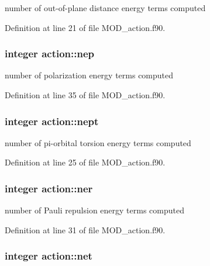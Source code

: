 number of out-\/of-\/plane distance energy terms computed 



Definition at line 21 of file M\-O\-D\-\_\-action.\-f90.

\hypertarget{classaction_a5f4acddc07739f99eea41cdb6be1b8dc}{
\subsubsection[{nep}]{\setlength{\rightskip}{0pt plus 5cm}integer action\-::nep}}\label{classaction_a5f4acddc07739f99eea41cdb6be1b8dc}


number of polarization energy terms computed 



Definition at line 35 of file M\-O\-D\-\_\-action.\-f90.

\hypertarget{classaction_a6fd320a2f65ee54d671119c638e1c85e}{
\subsubsection[{nept}]{\setlength{\rightskip}{0pt plus 5cm}integer action\-::nept}}\label{classaction_a6fd320a2f65ee54d671119c638e1c85e}


number of pi-\/orbital torsion energy terms computed 



Definition at line 25 of file M\-O\-D\-\_\-action.\-f90.

\hypertarget{classaction_a6eb242f86fd27e833b7e32aaa2fc887c}{
\subsubsection[{ner}]{\setlength{\rightskip}{0pt plus 5cm}integer action\-::ner}}\label{classaction_a6eb242f86fd27e833b7e32aaa2fc887c}


number of Pauli repulsion energy terms computed 



Definition at line 31 of file M\-O\-D\-\_\-action.\-f90.

\hypertarget{classaction_ae190d5331cec91c8023bbab730b28cb5}{
\subsubsection[{net}]{\setlength{\rightskip}{0pt plus 5cm}integer action\-::net}}\label{classaction_ae190d5331cec91c8023bbab730b28cb5}


